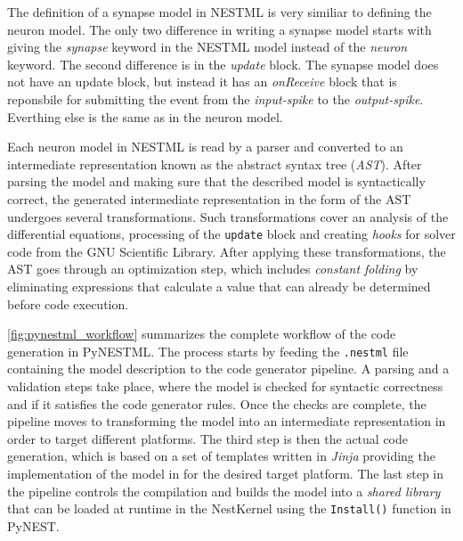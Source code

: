 The definition of a synapse model in NESTML is very similiar to defining the neuron model. The only two difference in writing a synapse model starts with giving the \emph{synapse} keyword in the NESTML model instead of the \emph{neuron} keyword. The second difference is in the \emph{update} block. The synapse model does not have an update block, but instead it has an \emph{onReceive} block that is reponsbile for submitting the event from the \emph{input-spike} to the \emph{output-spike}. Everthing else is the same as in the neuron model.

Each neuron model in NESTML is read by a parser and converted to an intermediate representation known as the abstract syntax tree (\emph{AST}). After parsing the model and making sure that the described model is syntactically correct, the generated intermediate representation in the form of the AST undergoes several transformations. Such transformations cover an analysis of the differential equations, processing of the \texttt{update} block and creating \emph{hooks} for solver code from the GNU Scientific Library. After applying these transformations, the AST goes through an optimization step, which includes \emph{constant folding} by eliminating expressions that calculate a value that can already be determined before code execution.

\autoref{fig:pynestml_workflow} summarizes the complete workflow of the code generation in PyNESTML. The process starts by feeding the \texttt{.nestml} file containing the model description to the code generator pipeline. A parsing and a validation steps take place, where the model is checked for syntactic correctness and if it satisfies the code generator rules. Once the checks are complete, the pipeline moves to transforming the model into an intermediate representation in order to target different platforms. The third step is then the actual code generation, which is based on a set of templates written in \emph{Jinja} \citep{jinja} providing the implementation of the model in for the desired target platform. The last step in the pipeline controls the compilation and builds the model into a \emph{shared library} that can be loaded at runtime in the NestKernel using the \texttt{Install()} function in PyNEST.

